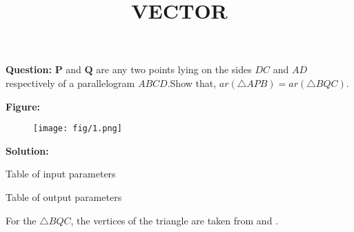 \documentclass[12pt]{article}
\let\vec\mathbf
\providecommand{\brak}[1]{\ensuremath{\left(#1\right)}}
\begin{document}
\title{\textbf{VECTOR}}
\date{}
\maketitle
\textbf{Question:} $\vec{P}$ and $\vec{Q}$ are any two points lying on the sides $DC$ and $AD$ respectively of a parallelogram $ABCD$.Show that, $ar\brak{\triangle APB}=ar\brak{\triangle BQC}$.


\textbf{Figure:}
\begin{figure}[H]
    \centering
   \texttt{[image: fig/1.png]}
    \caption{}
    \label{fig:fig:1}
\end{figure}


\textbf{Solution:}
\begin{table}[H]
   \centering
   
   \caption{Table of input parameters}         
	\label{tab:tab:1}                    
\end{table}




\begin{table}[H]
    \centering                                   
	                   
	\caption{Table of output parameters}
	\label{tab:tab:2}
 \end{table}


For the $\triangle BQC$, the vertices of the triangle are taken from  and .
\end{document}
